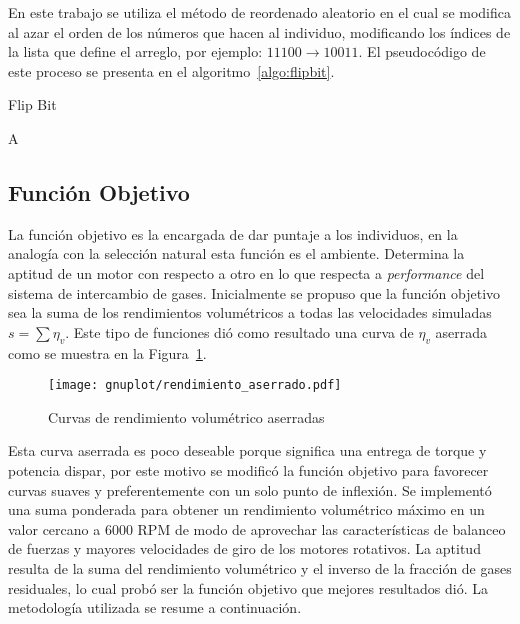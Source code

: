 En este trabajo se utiliza el método de reordenado aleatorio en el cual se
modifica al azar el orden de los números que hacen al individuo, modificando los
índices de la lista que define el arreglo, por ejemplo: $11100 \rightarrow 10011$.
%
El pseudocódigo de este proceso se presenta en el algoritmo~\ref{algo:flipbit}.

\begin{algorithm}
  \caption{Flip Bit}\label{algo:flipbit}
  \DontPrintSemicolon

    \Return A\;
\end{algorithm}

\subsection{Función Objetivo}\label{sec:funcion_objetivo}
%
La función objetivo es la encargada de dar puntaje a los individuos, en la
analogía con la selección natural esta función es el ambiente.
%
Determina la aptitud de un motor con respecto a otro en lo que respecta a
\emph{performance} del sistema de intercambio de gases.
%
Inicialmente se propuso que la función objetivo sea la suma de los rendimientos
volumétricos a todas las velocidades simuladas $s=\sum \eta_{v}$.
%
Este tipo de funciones dió como resultado una curva de $\eta_{v}$ aserrada como
se muestra en la Figura~\ref{fig:curva_aserrada}.

\begin{figure}[h!]
  \centering
  \texttt{[image: gnuplot/rendimiento\_aserrado.pdf]}
  \caption{Curvas de rendimiento volumétrico aserradas}\label{fig:curva_aserrada}
\end{figure}

Esta curva aserrada es poco deseable porque significa una entrega de torque y
potencia dispar, por este motivo se modificó la función objetivo para favorecer
curvas suaves y preferentemente con un solo punto de inflexión.
%
Se implementó una suma ponderada para obtener un rendimiento volumétrico máximo
en un valor cercano a 6000 RPM de modo de aprovechar las características de
balanceo de fuerzas y mayores velocidades de giro de los motores rotativos.
%
La aptitud resulta de la suma del rendimiento volumétrico y el inverso de la
fracción de gases residuales, lo cual probó ser la función objetivo que mejores
resultados dió.
La metodología utilizada se resume a continuación.

